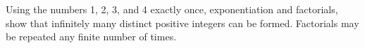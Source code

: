 Using the numbers 1, 2, 3, and 4 exactly once, exponentiation and factorials, show that infinitely many distinct positive integers can be formed. Factorials may be repeated any finite number of times.
